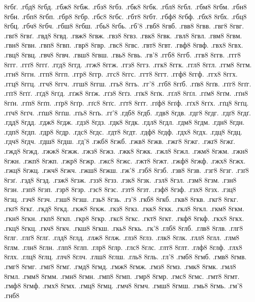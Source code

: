 {8гбґ.
.гбд8
8гбд.
.гбж8
8гбж.
.гбз8
8гбз.
.гбк8
8гбк.
.гбл8
8гбл.
.гбм8
8гбм.
.гбн8
8гбн.
.гбп8
8гбп.
.гбр8
8гбр.
.гбс8
8гбс.
.гбт8
8гбт.
.гбф8
8гбф.
.гбх8
8гбх.
.гбц8
8гбц.
.гбч8
8гбч.
.гбш8
8гбш.
.гбь8
8гбь.
.гб'8
.гвб8
8гвб.
.гвв8
8гвв.
.гвг8
8гвг.
.гвґ8
8гвґ.
.гвд8
8гвд.
.гвж8
8гвж.
.гвз8
8гвз.
.гвк8
8гвк.
.гвл8
8гвл.
.гвм8
8гвм.
.гвн8
8гвн.
.гвп8
8гвп.
.гвр8
8гвр.
.гвс8
8гвс.
.гвт8
8гвт.
.гвф8
8гвф.
.гвх8
8гвх.
.гвц8
8гвц.
.гвч8
8гвч.
.гвш8
8гвш.
.гвь8
8гвь.
.гв'8
.ггб8
8ггб.
.ггв8
8ггв.
.ггг8
8ггг.
.ггґ8
8ггґ.
.ггд8
8ггд.
.ггж8
8ггж.
.ггз8
8ггз.
.ггк8
8ггк.
.ггл8
8ггл.
.ггм8
8ггм.
.ггн8
8ггн.
.ггп8
8ггп.
.ггр8
8ггр.
.ггс8
8ггс.
.ггт8
8ггт.
.ггф8
8ггф.
.ггх8
8ггх.
.ггц8
8ггц.
.ггч8
8ггч.
.ггш8
8ггш.
.ггь8
8ггь.
.гг'8
.гґб8
8гґб.
.гґв8
8гґв.
.гґг8
8гґг.
.гґґ8
8гґґ.
.гґд8
8гґд.
.гґж8
8гґж.
.гґз8
8гґз.
.гґк8
8гґк.
.гґл8
8гґл.
.гґм8
8гґм.
.гґн8
8гґн.
.гґп8
8гґп.
.гґр8
8гґр.
.гґс8
8гґс.
.гґт8
8гґт.
.гґф8
8гґф.
.гґх8
8гґх.
.гґц8
8гґц.
.гґч8
8гґч.
.гґш8
8гґш.
.гґь8
8гґь.
.гґ'8
.гдб8
8гдб.
.гдв8
8гдв.
.гдг8
8гдг.
.гдґ8
8гдґ.
.гдд8
8гдд.
.гдж8
8гдж.
.гдз8
8гдз.
.гдк8
8гдк.
.гдл8
8гдл.
.гдм8
8гдм.
.гдн8
8гдн.
.гдп8
8гдп.
.гдр8
8гдр.
.гдс8
8гдс.
.гдт8
8гдт.
.гдф8
8гдф.
.гдх8
8гдх.
.гдц8
8гдц.
.гдч8
8гдч.
.гдш8
8гдш.
.гд'8
.гжб8
8гжб.
.гжв8
8гжв.
.гжг8
8гжг.
.гжґ8
8гжґ.
.гжд8
8гжд.
.гжж8
8гжж.
.гжз8
8гжз.
.гжк8
8гжк.
.гжл8
8гжл.
.гжм8
8гжм.
.гжн8
8гжн.
.гжп8
8гжп.
.гжр8
8гжр.
.гжс8
8гжс.
.гжт8
8гжт.
.гжф8
8гжф.
.гжх8
8гжх.
.гжц8
8гжц.
.гжч8
8гжч.
.гжш8
8гжш.
.гж'8
.гзб8
8гзб.
.гзв8
8гзв.
.гзг8
8гзг.
.гзґ8
8гзґ.
.гзд8
8гзд.
.гзж8
8гзж.
.гзз8
8гзз.
.гзк8
8гзк.
.гзл8
8гзл.
.гзм8
8гзм.
.гзн8
8гзн.
.гзп8
8гзп.
.гзр8
8гзр.
.гзс8
8гзс.
.гзт8
8гзт.
.гзф8
8гзф.
.гзх8
8гзх.
.гзц8
8гзц.
.гзч8
8гзч.
.гзш8
8гзш.
.гзь8
8гзь.
.гз'8
.гкб8
8гкб.
.гкв8
8гкв.
.гкг8
8гкг.
.гкґ8
8гкґ.
.гкд8
8гкд.
.гкж8
8гкж.
.гкз8
8гкз.
.гкк8
8гкк.
.гкл8
8гкл.
.гкм8
8гкм.
.гкн8
8гкн.
.гкп8
8гкп.
.гкр8
8гкр.
.гкс8
8гкс.
.гкт8
8гкт.
.гкф8
8гкф.
.гкх8
8гкх.
.гкц8
8гкц.
.гкч8
8гкч.
.гкш8
8гкш.
.гкь8
8гкь.
.гк'8
.глб8
8глб.
.глв8
8глв.
.глг8
8глг.
.глґ8
8глґ.
.глд8
8глд.
.глж8
8глж.
.глз8
8глз.
.глк8
8глк.
.глл8
8глл.
.глм8
8глм.
.глн8
8глн.
.глп8
8глп.
.глр8
8глр.
.глс8
8глс.
.глт8
8глт.
.глф8
8глф.
.глх8
8глх.
.глц8
8глц.
.глч8
8глч.
.глш8
8глш.
.гль8
8гль.
.гл'8
.гмб8
8гмб.
.гмв8
8гмв.
.гмг8
8гмг.
.гмґ8
8гмґ.
.гмд8
8гмд.
.гмж8
8гмж.
.гмз8
8гмз.
.гмк8
8гмк.
.гмл8
8гмл.
.гмм8
8гмм.
.гмн8
8гмн.
.гмп8
8гмп.
.гмр8
8гмр.
.гмс8
8гмс.
.гмт8
8гмт.
.гмф8
8гмф.
.гмх8
8гмх.
.гмц8
8гмц.
.гмч8
8гмч.
.гмш8
8гмш.
.гмь8
8гмь.
.гм'8
.гнб8
}
